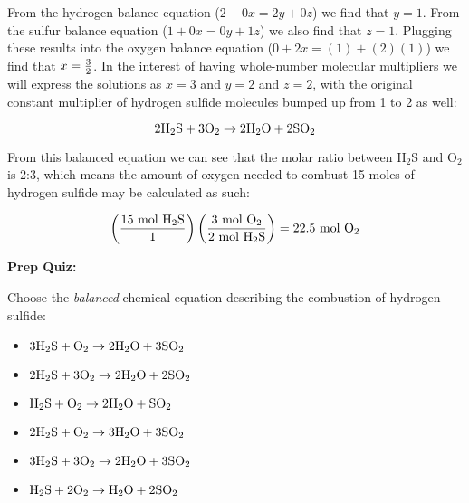 From the hydrogen balance equation ($2 + 0x = 2y + 0z$) we find that $y = 1$.  From the sulfur balance equation ($1 + 0x = 0y + 1z$) we also find that $z = 1$.  Plugging these results into the oxygen balance equation ($0 + 2x = (1) + (2)(1)$) we find that $x = {3 \over 2}$.  In the interest of having whole-number molecular multipliers we will express the solutions as $x = 3$ and $y = 2$ and $z = 2$, with the original constant multiplier of hydrogen sulfide molecules bumped up from 1 to 2 as well:

$$\hbox{2H}_2\hbox{S} + \hbox{3O}_2 \to \hbox{2H}_2\hbox{O} + \hbox{2SO}_2$$

From this balanced equation we can see that the molar ratio between H$_{2}$S and O$_{2}$ is 2:3, which means the amount of oxygen needed to combust 15 moles of hydrogen sulfide may be calculated as such:

$$\left({15 \hbox{ mol H}_2\hbox{S} \over 1}\right) \left({3 \hbox{ mol O}_2 \over 2 \hbox{ mol H}_2\hbox{S}}\right) = 22.5 \hbox{ mol O}_2$$












\vfil \eject

\noindent
{\bf Prep Quiz:}

Choose the {\it balanced} chemical equation describing the combustion of hydrogen sulfide:

\begin{itemize}
\item{} $\hbox{3H}_2\hbox{S} + \hbox{O}_2 \to \hbox{2H}_2\hbox{O} + \hbox{3SO}_2$
\vskip 10pt 
\item{} $\hbox{2H}_2\hbox{S} + \hbox{3O}_2 \to \hbox{2H}_2\hbox{O} + \hbox{2SO}_2$
\vskip 10pt 
\item{} $\hbox{H}_2\hbox{S} + \hbox{O}_2 \to \hbox{2H}_2\hbox{O} + \hbox{SO}_2$
\vskip 10pt 
\item{} $\hbox{2H}_2\hbox{S} + \hbox{O}_2 \to \hbox{3H}_2\hbox{O} + \hbox{3SO}_2$
\vskip 10pt 
\item{} $\hbox{3H}_2\hbox{S} + \hbox{3O}_2 \to \hbox{2H}_2\hbox{O} + \hbox{3SO}_2$
\vskip 10pt 
\item{} $\hbox{H}_2\hbox{S} + \hbox{2O}_2 \to \hbox{H}_2\hbox{O} + \hbox{2SO}_2$
\end{itemize}





